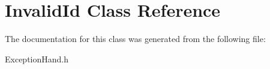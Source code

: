\hypertarget{class_invalid_id}{}\section{Invalid\+Id Class Reference}
\label{class_invalid_id}


The documentation for this class was generated from the following file\+:\begin{DoxyCompactItemize}
\item 
Exception\+Hand.\+h\end{DoxyCompactItemize}

